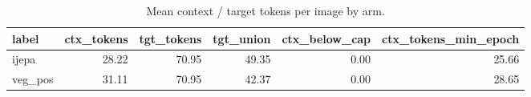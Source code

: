 \begin{table}[t]
\centering
\small
\caption{Mean context / target tokens per image by arm.}
\label{tab:token_budget}
\begin{tabular}{lrrrrr}
\toprule
label & ctx\_tokens & tgt\_tokens & tgt\_union & ctx\_below\_cap & ctx\_tokens\_min\_epoch \\
\midrule
ijepa & 28.22 & 70.95 & 49.35 & 0.00 & 25.66 \\
veg\_pos & 31.11 & 70.95 & 42.37 & 0.00 & 28.65 \\
\bottomrule
\end{tabular}
\end{table}
